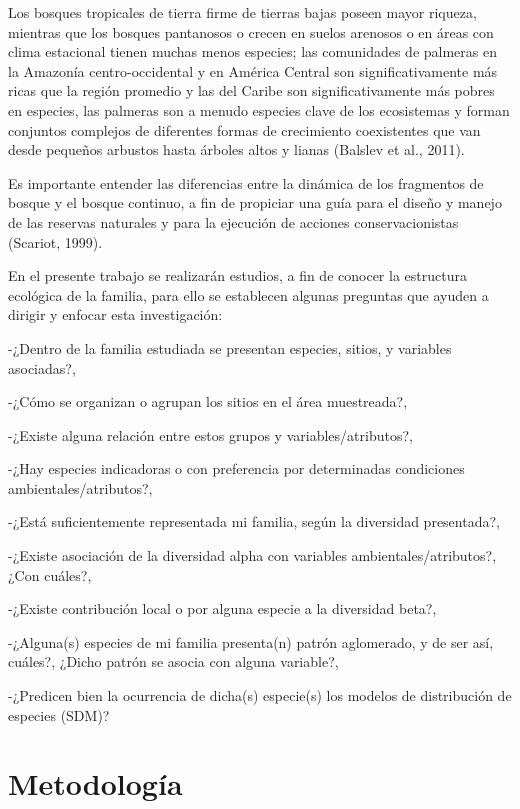 \documentclass[11pt,]{article}
\begin{document}
Los bosques tropicales de tierra firme de tierras bajas poseen mayor
riqueza, mientras que los bosques pantanosos o crecen en suelos arenosos
o en áreas con clima estacional tienen muchas menos especies; las
comunidades de palmeras en la Amazonía centro-occidental y en América
Central son significativamente más ricas que la región promedio y las
del Caribe son significativamente más pobres en especies, las palmeras
son a menudo especies clave de los ecosistemas y forman conjuntos
complejos de diferentes formas de crecimiento coexistentes que van desde
pequeños arbustos hasta árboles altos y lianas (Balslev et al., 2011).

Es importante entender las diferencias entre la dinámica de los
fragmentos de bosque y el bosque continuo, a fin de propiciar una guía
para el diseño y manejo de las reservas naturales y para la ejecución de
acciones conservacionistas (Scariot, 1999).

En el presente trabajo se realizarán estudios, a fin de conocer la
estructura ecológica de la familia, para ello se establecen algunas
preguntas que ayuden a dirigir y enfocar esta investigación:

-¿Dentro de la familia estudiada se presentan especies, sitios, y
variables asociadas?,

-¿Cómo se organizan o agrupan los sitios en el área muestreada?,

-¿Existe alguna relación entre estos grupos y variables/atributos?,

-¿Hay especies indicadoras o con preferencia por determinadas
condiciones ambientales/atributos?,

-¿Está suficientemente representada mi familia, según la diversidad
presentada?,

-¿Existe asociación de la diversidad alpha con variables
ambientales/atributos?, ¿Con cuáles?,

-¿Existe contribución local o por alguna especie a la diversidad beta?,

-¿Alguna(s) especies de mi familia presenta(n) patrón aglomerado, y de
ser así, cuáles?, ¿Dicho patrón se asocia con alguna variable?,

-¿Predicen bien la ocurrencia de dicha(s) especie(s) los modelos de
distribución de especies (SDM)?

\section{Metodología}\label{metodologuxeda}
\end{document}
